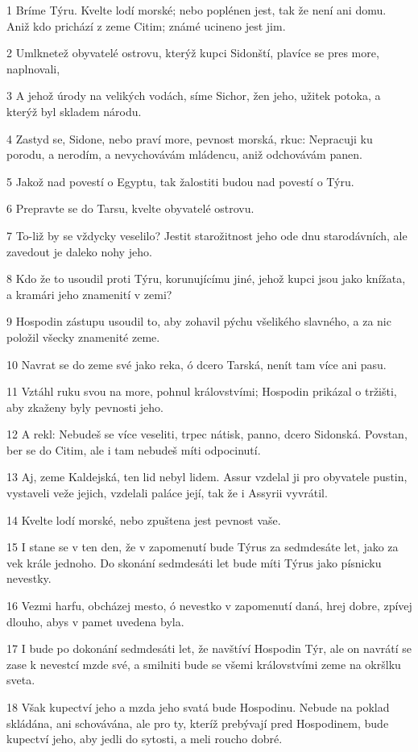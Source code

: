 \par 1 Bríme Týru. Kvelte lodí morské; nebo poplénen jest, tak že není ani domu. Aniž kdo prichází z zeme Citim; známé ucineno jest jim.
\par 2 Umlknetež obyvatelé ostrovu, kterýž kupci Sidonští, plavíce se pres more, naplnovali,
\par 3 A jehož úrody na velikých vodách, síme Sichor, žen jeho, užitek potoka, a kterýž byl skladem národu.
\par 4 Zastyd se, Sidone, nebo praví more, pevnost morská, rkuc: Nepracuji ku porodu, a nerodím, a nevychovávám mládencu, aniž odchovávám panen.
\par 5 Jakož nad povestí o Egyptu, tak žalostiti budou nad povestí o Týru.
\par 6 Prepravte se do Tarsu, kvelte obyvatelé ostrovu.
\par 7 To-liž by se vždycky veselilo? Jestit starožitnost jeho ode dnu starodávních, ale zavedout je daleko nohy jeho.
\par 8 Kdo že to usoudil proti Týru, korunujícímu jiné, jehož kupci jsou jako knížata, a kramári jeho znamenití v zemi?
\par 9 Hospodin zástupu usoudil to, aby zohavil pýchu všelikého slavného, a za nic položil všecky znamenité zeme.
\par 10 Navrat se do zeme své jako reka, ó dcero Tarská, nenít tam více ani pasu.
\par 11 Vztáhl ruku svou na more, pohnul královstvími; Hospodin prikázal o tržišti, aby zkaženy byly pevnosti jeho.
\par 12 A rekl: Nebudeš se více veseliti, trpec nátisk, panno, dcero Sidonská. Povstan, ber se do Citim, ale i tam nebudeš míti odpocinutí.
\par 13 Aj, zeme Kaldejská, ten lid nebyl lidem. Assur vzdelal ji pro obyvatele pustin, vystaveli veže jejich, vzdelali paláce její, tak že i Assyrii vyvrátil.
\par 14 Kvelte lodí morské, nebo zpuštena jest pevnost vaše.
\par 15 I stane se v ten den, že v zapomenutí bude Týrus za sedmdesáte let, jako za vek krále jednoho. Do skonání sedmdesáti let bude míti Týrus jako písnicku nevestky.
\par 16 Vezmi harfu, obcházej mesto, ó nevestko v zapomenutí daná, hrej dobre, zpívej dlouho, abys v pamet uvedena byla.
\par 17 I bude po dokonání sedmdesáti let, že navštíví Hospodin Týr, ale on navrátí se zase k nevestcí mzde své, a smilniti bude se všemi královstvími zeme na okršlku sveta.
\par 18 Však kupectví jeho a mzda jeho svatá bude Hospodinu. Nebude na poklad skládána, ani schovávána, ale pro ty, kteríž prebývají pred Hospodinem, bude kupectví jeho, aby jedli do sytosti, a meli roucho dobré.

